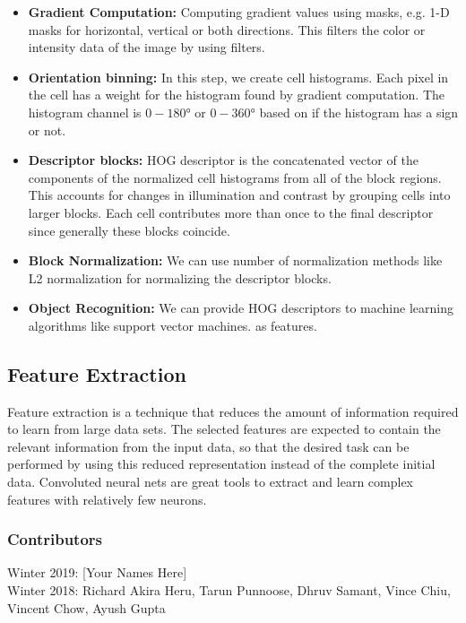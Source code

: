 \documentclass[twoside]{article}
\begin{document}
\begin{itemize}
\item \textbf{Gradient Computation:}
Computing gradient values using masks, e.g. 1-D masks for horizontal, vertical or both directions. This filters the color or intensity data of the image by using filters.

\item \textbf{Orientation binning:}
In this step, we create cell histograms. Each pixel in the cell has a weight for the histogram found by gradient computation. The histogram channel is $0-\ang{180} $ or $0-\ang{360}$  based on if the histogram has a sign or not.

\item \textbf{Descriptor blocks:}
HOG descriptor is the concatenated vector of the components of the normalized cell histograms from all of the block regions. This accounts for changes in illumination and contrast by grouping cells into larger blocks. Each cell contributes more than once to the final descriptor since generally these blocks coincide.

\item \textbf{Block Normalization:}
We can use number of normalization methods like L2 normalization for normalizing the descriptor blocks.

\item \textbf{Object Recognition:}
We can provide HOG descriptors to machine learning algorithms like support vector machines. as features.

\end{itemize}


\subsection{Feature Extraction}
Feature extraction is a technique that reduces the amount of information required to learn from large data sets. The selected features are expected to contain the relevant information from the input data, so that the desired task can be performed by using this reduced representation instead of the complete initial data. Convoluted neural nets are great tools to extract and learn complex features with relatively few neurons.





\subsubsection*{Contributors}
Winter 2019: [Your Names Here]
\\
Winter 2018: Richard Akira Heru, Tarun Punnoose, Dhruv Samant, Vince Chiu, Vincent Chow, Ayush Gupta
\end{document}
